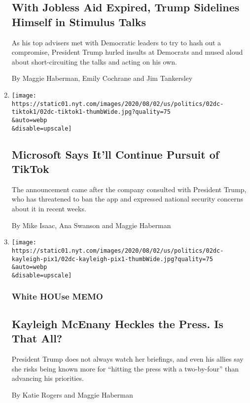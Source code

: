 \begin{enumerate}
  \hypertarget{with-jobless-aid-expired-trump-sidelines-himself-in-stimulus-talks}{%
  \subsection{With Jobless Aid Expired, Trump Sidelines Himself in
  Stimulus
  Talks}\label{with-jobless-aid-expired-trump-sidelines-himself-in-stimulus-talks}}

  As his top advisers met with Democratic leaders to try to hash out a
  compromise, President Trump hurled insults at Democrats and mused
  aloud about short-circuiting the talks and acting on his own.

  By Maggie Haberman, Emily Cochrane and Jim Tankersley
\item
  \href{/2020/08/02/business/economy/trump-tiktok-china-national-security.html}{}

  \texttt{[image: https://static01.nyt.com/images/2020/08/02/us/politics/02dc-tiktok1/02dc-tiktok1-thumbWide.jpg?quality=75\\\&auto=webp\\\&disable=upscale]}

  \hypertarget{microsoft-says-itll-continue-pursuit-of-tiktok}{%
  \subsection{Microsoft Says It'll Continue Pursuit of
  TikTok}\label{microsoft-says-itll-continue-pursuit-of-tiktok}}

  The announcement came after the company consulted with President
  Trump, who has threatened to ban the app and expressed national
  security concerns about it in recent weeks.

  By Mike Isaac, Ana Swanson and Maggie Haberman
\item
  \href{/2020/08/02/us/politics/kayleigh-mcenany.html}{}

  \texttt{[image: https://static01.nyt.com/images/2020/08/02/us/politics/02dc-kayleigh-pix1/02dc-kayleigh-pix1-thumbWide.jpg?quality=75\\\&auto=webp\\\&disable=upscale]}

  \hypertarget{white-house-memo}{%
  \subsubsection{White HOUse MEMO}\label{white-house-memo}}

  \hypertarget{kayleigh-mcenany-heckles-the-press-is-that-all}{%
  \subsection{Kayleigh McEnany Heckles the Press. Is That
  All?}\label{kayleigh-mcenany-heckles-the-press-is-that-all}}

  President Trump does not always watch her briefings, and even his
  allies say she risks being known more for ``hitting the press with a
  two-by-four'' than advancing his priorities.

  By Katie Rogers and Maggie Haberman
\end{enumerate}

